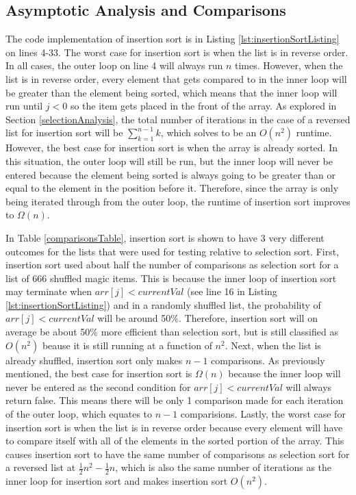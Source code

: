 \documentclass[letterpaper, 10pt,DIV=13]{scrartcl}
\numberwithin{equation}{section} %
\numberwithin{figure}{section} %
\numberwithin{table}{section} %
\begin{document}
\subsection{Asymptotic Analysis and Comparisons}\label{insertionAnalysis}
The code implementation of insertion sort is in Listing \ref{lst:insertionSortListing} on lines 4-33. The worst case for insertion sort is when the list is in reverse order. In all cases, the outer loop on line 4 will always run $n$ times. However, when the list is in reverse order, every element that gets compared to in the inner loop will be greater than the element being sorted, which means that the inner loop will run until $j < 0$ so the item gets placed in the front of the array. As explored in Section \ref{selectionAnalysis}, the total number of iterations in the case of a reversed list for insertion sort will be $\sum_{k = 1} ^{n - 1} k$, which solves to be an $O(n^2)$ runtime. However, the best case for insertion sort is when the array is already sorted. In this situation, the outer loop will still be run, but the inner loop will never be entered because the element being sorted is always going to be greater than or equal to the element in the position before it. Therefore, since the array is only being iterated through from the outer loop, the runtime of insertion sort improves to $\Omega(n)$.

In Table \ref{comparisonsTable}, insertion sort is shown to have 3 very different outcomes for the lists that were used for testing relative to selection sort. First, insertion sort used about half the number of comparisons as selection sort for a list of 666 shuffled magic items. This is because the inner loop of insertion sort may terminate when $arr[j] < currentVal$ (see line 16 in Listing \ref{lst:insertionSortListing}) and in a randomly shuffled list, the probability of $arr[j] < currentVal$ will be around 50\%. Therefore, insertion sort will on average be about 50\% more efficient than selection sort, but is still classified as $O(n^2)$ beause it is still running at a function of $n^2$. Next, when the list is already shuffled, insertion sort only makes $n-1$ comparisons. As previously mentioned, the best case for insertion sort is $\Omega(n)$ because the inner loop will never be entered as the second condition for $arr[j] < currentVal$ will always return false. This means there will be only 1 comparison made for each iteration of the outer loop, which equates to $n - 1$ comparisions. Lastly, the worst case for insertion sort is when the list is in reverse order because every element will have to compare itself with all of the elements in the sorted portion of the array. This causes insertion sort to have the same number of comparisons as selection sort for a reversed list at $\frac{1}{2}n^2 - \frac{1}{2}n$, which is also the same number of iterations as the inner loop for insertion sort and makes insertion sort $O(n^2)$.
\end{document}
